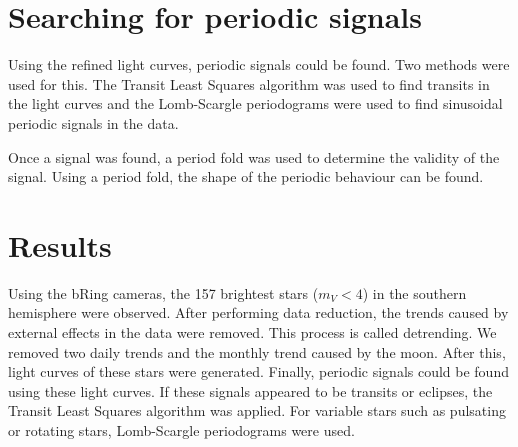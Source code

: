 \documentclass[onecolumn]{aa} %
\begin{document}
\section{Searching for periodic signals}
\label{sec:tlslomb}
Using the refined light curves, periodic signals could be found. Two methods were used for this. The Transit Least Squares algorithm was used to find transits in the light curves and the Lomb-Scargle periodograms were used to find sinusoidal periodic signals in the data.

Once a signal was found, a period fold was used to determine the validity of the signal. Using a period fold, the shape of the periodic behaviour can be found.

\section{Results}
\label{sec:results}
Using the bRing cameras, the 157 brightest stars ($m_V < 4$) in the southern hemisphere were observed. After performing data reduction, the trends caused by external effects in the data were removed. This process is called detrending. We removed two daily trends and the monthly trend caused by the moon. After this, light curves of these stars were generated. Finally, periodic signals could be found using these light curves. If these signals appeared to be transits or eclipses, the Transit Least Squares algorithm \citep{Hippke_2019} was applied. For variable stars such as pulsating or rotating stars, Lomb-Scargle periodograms \citep{VanderPlas_2012} \citep{VanderPlas_2015} were used. 
\end{document}
